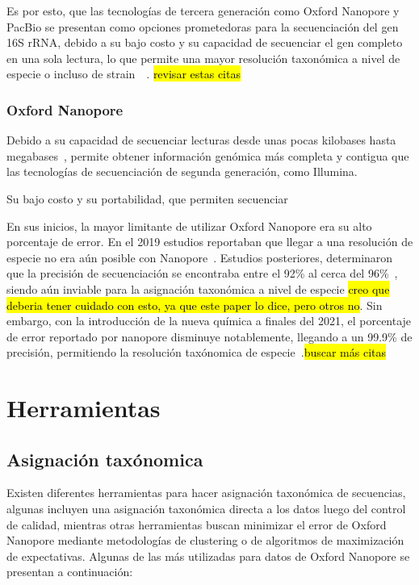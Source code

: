 Es por esto, que las tecnologías de tercera generación como Oxford Nanopore y PacBio se presentan como opciones prometedoras para la secuenciación del gen 16S rRNA, debido a su bajo costo y su capacidad de secuenciar el gen completo en una sola lectura, lo que permite una mayor resolución taxonómica a nivel de especie o incluso de strain~\cite{szoboszlay2023nanopore}~\cite{urban2021freshwater,delahaye2021sequencing}. \hl{revisar estas citas}

\subsubsection{Oxford Nanopore}
Debido a su capacidad de secuenciar lecturas desde unas pocas kilobases hasta megabases~\cite{amarasinghe2020opportunities}, permite obtener información genómica más completa y contigua que las tecnologías de secuenciación de segunda generación, como Illumina.

Su bajo costo y su portabilidad, que permiten secuenciar 

En sus inicios, la mayor limitante de utilizar Oxford Nanopore era su alto porcentaje de error. En el 2019 estudios reportaban que llegar a una resolución de especie no era aún posible con Nanopore~\cite{winand2019targeting}. Estudios posteriores, determinaron que la precisión de secuenciación se encontraba entre el 92\% al cerca del 96\%~\cite{urban2021freshwater,delahaye2021sequencing}, siendo aún inviable para la asignación taxonómica a nivel de especie \hl{creo que deberia tener cuidado con esto, ya que este paper lo dice, pero otros no}. Sin embargo, con la introducción de la nueva química a finales del 2021, el porcentaje de error reportado por nanopore disminuye notablemente, llegando a un 99.9\% de precisión, permitiendo la resolución taxónomica de especie~\cite{yoon2017introducing}.\hl{buscar más citas}


\section{Herramientas}
\subsection{Asignación taxónomica}
Existen diferentes herramientas para hacer asignación taxonómica de secuencias, algunas incluyen una asignación taxonómica directa a los datos luego del control de calidad, mientras otras herramientas buscan minimizar el error de Oxford Nanopore mediante metodologías de clustering o de algoritmos de maximización de expectativas. Algunas de las más utilizadas para datos de Oxford Nanopore se presentan a continuación:

